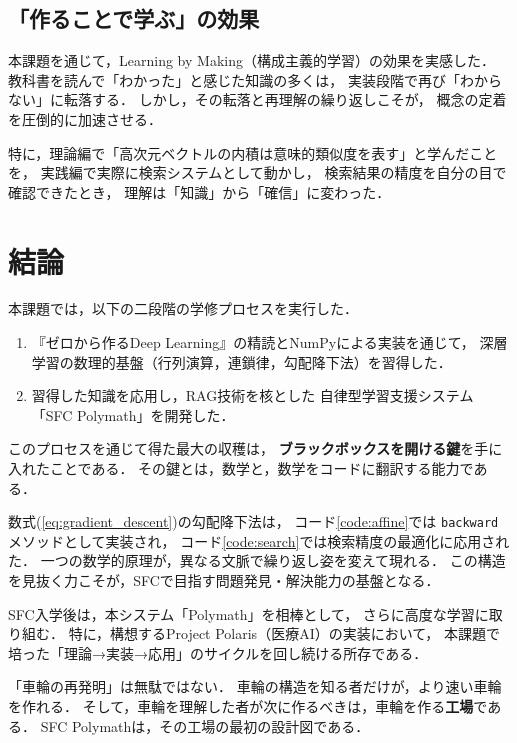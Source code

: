 \documentclass[uplatex, dvipdfmx, a4paper, 11pt]{jsarticle}
\begin{document}
\subsection{「作ることで学ぶ」の効果}
本課題を通じて，Learning by Making（構成主義的学習）の効果を実感した．
教科書を読んで「わかった」と感じた知識の多くは，
実装段階で再び「わからない」に転落する．
しかし，その転落と再理解の繰り返しこそが，
概念の定着を圧倒的に加速させる．

特に，理論編で「高次元ベクトルの内積は意味的類似度を表す」と学んだことを，
実践編で実際に検索システムとして動かし，
検索結果の精度を自分の目で確認できたとき，
理解は「知識」から「確信」に変わった．


\section{結論}

本課題では，以下の二段階の学修プロセスを実行した．

\begin{enumerate}
    \item 『ゼロから作るDeep Learning』の精読とNumPyによる実装を通じて，
          深層学習の数理的基盤（行列演算，連鎖律，勾配降下法）を習得した．
    \item 習得した知識を応用し，RAG技術を核とした
          自律型学習支援システム「SFC Polymath」を開発した．
\end{enumerate}

このプロセスを通じて得た最大の収穫は，
\textbf{ブラックボックスを開ける鍵}を手に入れたことである．
その鍵とは，数学と，数学をコードに翻訳する能力である．

数式(\ref{eq:gradient_descent})の勾配降下法は，
コード\ref{code:affine}では \texttt{backward} メソッドとして実装され，
コード\ref{code:search}では検索精度の最適化に応用された．
一つの数学的原理が，異なる文脈で繰り返し姿を変えて現れる．
この構造を見抜く力こそが，SFCで目指す問題発見・解決能力の基盤となる．

SFC入学後は，本システム「Polymath」を相棒として，
さらに高度な学習に取り組む．
特に，構想するProject Polaris（医療AI）の実装において，
本課題で培った「理論→実装→応用」のサイクルを回し続ける所存である．

「車輪の再発明」は無駄ではない．
車輪の構造を知る者だけが，より速い車輪を作れる．
そして，車輪を理解した者が次に作るべきは，車輪を作る\textbf{工場}である．
SFC Polymathは，その工場の最初の設計図である．
\end{document}
